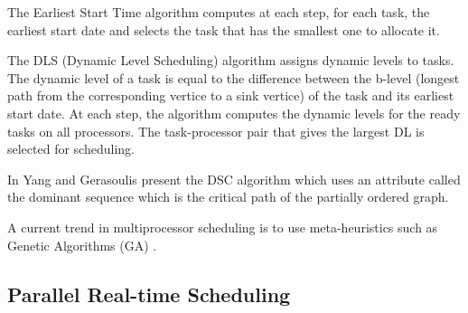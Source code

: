 The Earliest Start Time algorithm \cite{hwang:1989} computes at each step, for each task, the earliest start date and selects the task that has the smallest one to allocate it. 

The DLS (Dynamic Level Scheduling) algorithm \cite{sih:1993} assigns dynamic levels to tasks. The dynamic level of a task is equal to the difference between the b-level (longest path from the corresponding vertice to a sink vertice) of the task and its earliest start date. At each step, the algorithm computes the dynamic levels for the ready tasks on all processors. The task-processor pair that gives the largest DL is selected for scheduling. 

In \cite{yang:1994} Yang and Gerasoulis present the DSC algorithm which uses an attribute called the dominant sequence which is the critical path of the partially ordered graph.

A current trend in multiprocessor scheduling is to use meta-heuristics such as Genetic Algorithms (GA) \cite{hou:1994, wu:2004, omara:2010}.

\subsection{Parallel Real-time Scheduling}

